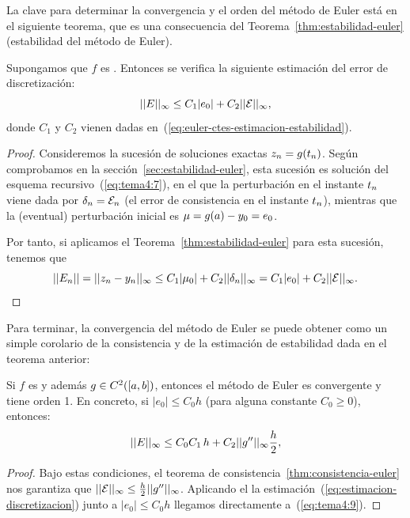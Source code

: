 La clave para determinar la convergencia y el orden del método de
Euler está en el siguiente teorema, que es una consecuencia del
Teorema~\ref{thm:estabilidad-euler} (estabilidad del método de Euler).
\begin{theorem}
  \label{thm:euler:estimacion-error-discretizacion}
  Supongamos que $f$ es \globLipschitz. Entonces se verifica la
  siguiente estimación del error de discretización:
  \begin{equation}
    \label{eq:estimacion-discretizacion}
    ||E||_\infty \le C_1 |e_0| + C_2 ||{\cal E}||_\infty,
  \end{equation}
  donde $C_1$ y $C_2$ vienen dadas
  en~(\ref{eq:euler-ctes-estimacion-estabilidad}).
\end{theorem}
\begin{proof}
  Consideremos la sucesión de soluciones exactas $z_n=g({t_n})$. Según
  comprobamos en la sección~\ref{sec:estabilidad-euler}, esta sucesión
  es solución del esquema recursivo~(\ref{eq:tema4:7}), en el que la
  perturbación en el instante ${t_n}$ viene dada por
  $\delta_n={\cal E}_n$ (el error de consistencia en el instante
  ${t_n}$), mientras que la (eventual) perturbación inicial es
  $\mu=g(a)-y_0=e_0$.

  Por tanto, si aplicamos el Teorema~\ref{thm:estabilidad-euler} para
  esta sucesión, tenemos que
  $$
  ||E_n|| = ||{z_n} - {y_n}||_\infty \le C_1|\mu_0| + C_2
  ||\delta_n||_\infty  = C_1|e_0| + C_2 ||{\cal E}||_\infty.
  $$
\end{proof}

Para terminar, la convergencia del método de Euler se puede obtener
como un simple corolario de la consistencia y de la estimación de
estabilidad dada en el teorema anterior:

\begin{corollary}
  \label{cor:euler:convergencia-y-orden}
  Si $f$ es \globLipschitz y además $g\in C^2([a,b])$, entonces el método de Euler es
  convergente y tiene orden 1. En concreto, si $|e_0|\le C_0 h$ (para
  alguna constante $C_0\ge 0$), entonces:
  \begin{equation}
    \label{eq:tema4:9}
    ||E||_\infty \le C_0 C_1 \, h + C_2 ||g''||_\infty \frac h2,
  \end{equation}
\end{corollary}

\begin{proof}
  Bajo estas condiciones, el teorema de
  consistencia~\ref{thm:consistencia-euler} nos garantiza que
  $||{\cal E}||_\infty \le \frac h2 ||g''||_\infty$. Aplicando el la
  estimación~(\ref{eq:estimacion-discretizacion}) junto a
  $|e_0|\le C_0 h$ llegamos directamente a~(\ref{eq:tema4:9}).
\end{proof}

